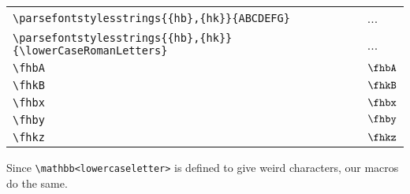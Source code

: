 \documentclass{article}
\begin{document}
\begin{tabular}{ll}
	\verb!\parsefontstylesstrings{{hb},{hk}}{ABCDEFG}! & ...\\
	\verb!\parsefontstylesstrings{{hb},{hk}}{\lowerCaseRomanLetters}! & ...\\
    \verb!\fhbA! & $\fhbA$ \\
	\verb!\fhkB! & $\fhkB$ \\
	\verb!\fhbx! & $\fhbx$ \\
	\verb!\fhby! & $\fhby$ \\
	\verb!\fhkz! & $\fhkz$ \\
\end{tabular}

Since \texttt{\textbackslash mathbb{<lowercaseletter>}} is defined to give weird characters, our macros do the same.
\end{document}
